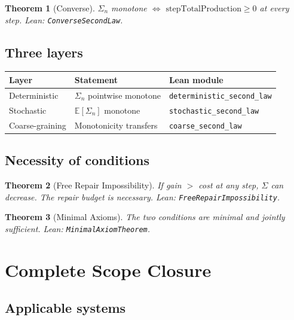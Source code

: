 \documentclass[11pt,a4paper]{article}
\newtheorem{theorem}{Theorem}[section]
\begin{document}
\begin{theorem}[Converse]\label{thm:converse}
$\Sigma_n$ monotone $\iff$ $\text{stepTotalProduction} \geq 0$ at every step. Lean: \texttt{ConverseSecondLaw}.
\end{theorem}

\subsection{Three layers}

\begin{center}
\begin{tabular}{lll}
\toprule
Layer & Statement & Lean module \\
\midrule
Deterministic & $\Sigma_n$ pointwise monotone & \texttt{deterministic\_second\_law} \\
Stochastic & $\mathbb{E}[\Sigma_n]$ monotone & \texttt{stochastic\_second\_law} \\
Coarse-graining & Monotonicity transfers & \texttt{coarse\_second\_law} \\
\bottomrule
\end{tabular}
\end{center}

\subsection{Necessity of conditions}

\begin{theorem}[Free Repair Impossibility]\label{thm:freerepair}
If gain $>$ cost at any step, $\Sigma$ can decrease. The repair budget is necessary. Lean: \texttt{FreeRepairImpossibility}.
\end{theorem}

\begin{theorem}[Minimal Axioms]\label{thm:minimal}
The two conditions are minimal and jointly sufficient. Lean: \texttt{MinimalAxiomTheorem}.
\end{theorem}

\section{Complete Scope Closure}

\subsection{Applicable systems}
\end{document}
